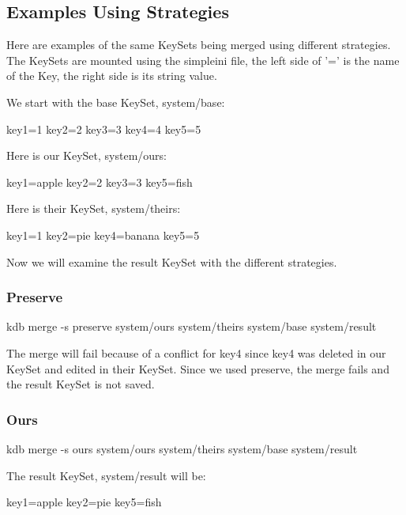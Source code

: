 \subsection*{Examples Using Strategies}

Here are examples of the same Key\+Sets being merged using different strategies. The Key\+Sets are mounted using the simpleini file, the left side of '=' is the name of the Key, the right side is its string value.

We start with the base Key\+Set, system/base\+: \begin{DoxyVerb}    key1=1
    key2=2
    key3=3
    key4=4
    key5=5
\end{DoxyVerb}


Here is our Key\+Set, system/ours\+: \begin{DoxyVerb}    key1=apple
    key2=2
    key3=3
    key5=fish
\end{DoxyVerb}


Here is their Key\+Set, system/theirs\+: \begin{DoxyVerb}    key1=1
    key2=pie
    key4=banana
    key5=5
\end{DoxyVerb}


Now we will examine the result Key\+Set with the different strategies.

\subsubsection*{Preserve}

\begin{DoxyVerb}    kdb merge -s preserve system/ours system/theirs system/base system/result
\end{DoxyVerb}


The merge will fail because of a conflict for key4 since key4 was deleted in our Key\+Set and edited in their Key\+Set. Since we used preserve, the merge fails and the result Key\+Set is not saved.

\subsubsection*{Ours}

\begin{DoxyVerb}    kdb merge -s ours system/ours system/theirs system/base system/result
\end{DoxyVerb}


The result Key\+Set, system/result will be\+: \begin{DoxyVerb}    key1=apple
    key2=pie
    key5=fish
\end{DoxyVerb}



